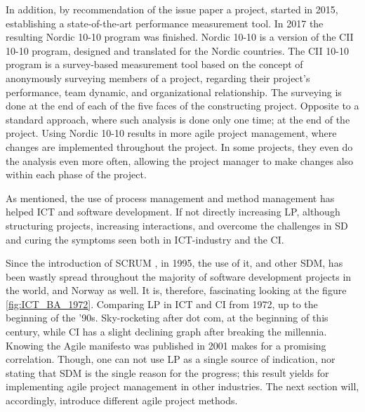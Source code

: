 In addition, by recommendation of the issue paper a project, started in 2015, establishing a state-of-the-art performance measurement tool. In 2017 the resulting Nordic 10-10 \cite{nordic-10-10} program was finished. Nordic 10-10 is a version of the CII 10-10 program\cite{CII-10-10}, designed and translated for the Nordic countries. The CII 10-10 program is a survey-based measurement tool based on the concept of anonymously surveying members of a project, regarding their project's performance, team dynamic, and organizational relationship. The surveying is done at the end of each of the five faces of the constructing project. Opposite to a standard approach, where such analysis is done only one time; at the end of the project. Using Nordic 10-10 results in more agile project management, where changes are implemented throughout the project. In some projects, they even do the analysis even more often, allowing the project manager to make changes also within each phase of the project. 

As mentioned, the use of process management and method management has helped ICT and software development. If not directly increasing LP, although structuring projects, increasing interactions, and overcome the challenges in SD and curing the symptoms seen both in ICT-industry and the CI.  

Since the introduction of SCRUM \cite{sutherland}, in 1995, the use of it, and other SDM, has been wastly spread throughout the majority of software development projects in the world, and Norway as well. It is, therefore, fascinating looking at the figure \ref{fig:ICT_BA_1972}. Comparing LP in ICT and CI from 1972, up to the beginning of the '90s. Sky-rocketing after dot com, at the beginning of this century, while CI has a slight declining graph after breaking the millennia. Knowing the Agile manifesto was published in 2001 makes for a promising correlation. Though, one can not use LP as a single source of indication, nor stating that SDM is the single reason for the progress; this result yields for implementing agile project management in other industries. The next section will, accordingly, introduce different agile project methods.

